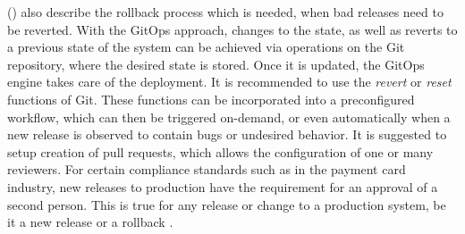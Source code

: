 \citeauthor{gitopsAndKubernetes2021continuous} (\citeyear{gitopsAndKubernetes2021continuous})
also describe the rollback process which is needed,
when bad releases need to be reverted.
With the GitOps approach, changes to the state, as well as reverts to a previous state
of the system can be achieved via operations on the Git repository,
where the desired state is stored. Once it is updated, the GitOps engine takes care of the deployment.
It is recommended to use the \textit{revert} or \textit{reset} functions of Git.
These functions can be incorporated into a preconfigured workflow,
which can then be triggered on-demand,
or even automatically when a new release is observed to contain bugs or undesired behavior.
It is suggested to setup creation of pull requests,
which allows the configuration of one or many reviewers.
For certain compliance standards such as in the payment card industry,
new releases to production have the requirement for an approval of a second person.
This is true for any release or change to a production system,
be it a new release or a rollback
\autocite{gitopsAndKubernetes2021continuous}.





















